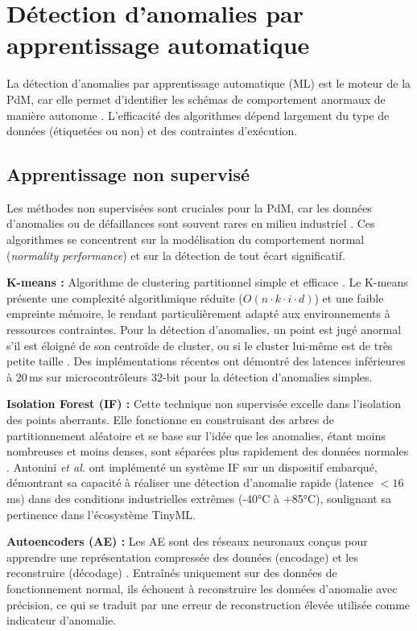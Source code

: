 \section{Détection d'anomalies par apprentissage automatique}

La détection d'anomalies par apprentissage automatique (ML) est le moteur de la PdM, car elle permet d'identifier les schémas de comportement anormaux de manière autonome \cite{achouch2022,chandola2009}. L'efficacité des algorithmes dépend largement du type de données (étiquetées ou non) et des contraintes d'exécution.

\subsection{Apprentissage non supervisé}

Les méthodes non supervisées sont cruciales pour la PdM, car les données d'anomalies ou de défaillances sont souvent rares en milieu industriel \cite{arciniegas2025}. Ces algorithmes se concentrent sur la modélisation du comportement normal (\textit{normality performance}) et sur la détection de tout écart significatif.

\textbf{K-means :} Algorithme de clustering partitionnel simple et efficace \cite{macqueen1967}. Le K-means présente une complexité algorithmique réduite ($O(n \cdot k \cdot i \cdot d)$) et une faible empreinte mémoire, le rendant particulièrement adapté aux environnements à ressources contraintes. Pour la détection d'anomalies, un point est jugé anormal s'il est éloigné de son centroïde de cluster, ou si le cluster lui-même est de très petite taille \cite{arciniegas2025,chandola2009}. Des implémentations récentes ont démontré des latences inférieures à 20\,ms sur microcontrôleurs 32-bit pour la détection d'anomalies simples.

\textbf{Isolation Forest (IF) :} Cette technique non supervisée excelle dans l'isolation des points aberrants. Elle fonctionne en construisant des arbres de partitionnement aléatoire et se base sur l'idée que les anomalies, étant moins nombreuses et moins denses, sont séparées plus rapidement des données normales \cite{antonini2023}. Antonini \textit{et al.} \cite{antonini2023} ont implémenté un système IF sur un dispositif embarqué, démontrant sa capacité à réaliser une détection d'anomalie rapide (latence $<16$\,ms) dans des conditions industrielles extrêmes (-40°C à +85°C), soulignant sa pertinence dans l'écosystème TinyML.

\textbf{Autoencoders (AE) :} Les AE sont des réseaux neuronaux conçus pour apprendre une représentation compressée des données (encodage) et les reconstruire (décodage) \cite{ran2019}. Entraînés uniquement sur des données de fonctionnement normal, ils échouent à reconstruire les données d'anomalie avec précision, ce qui se traduit par une erreur de reconstruction élevée utilisée comme indicateur d'anomalie.

